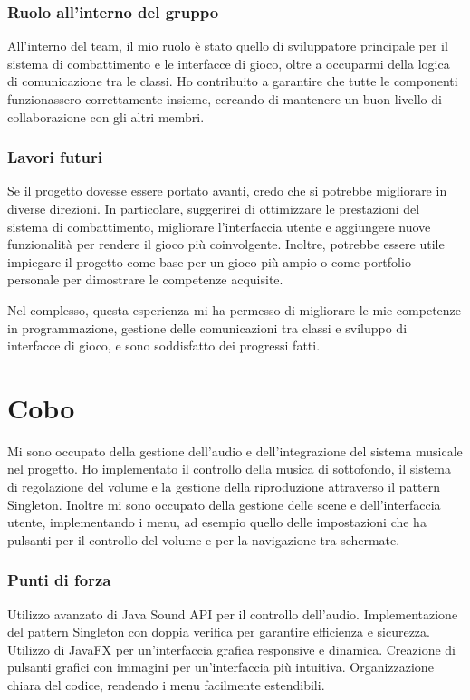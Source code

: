 \documentclass[a4paper,12pt]{report}
\begin{document}
\subsubsection{Ruolo all'interno del gruppo}
All'interno del team, il mio ruolo è stato quello di sviluppatore principale per il sistema di combattimento e le interfacce di gioco, oltre a occuparmi della logica di comunicazione tra le classi. Ho contribuito a garantire che tutte le componenti funzionassero correttamente insieme, cercando di mantenere un buon livello di collaborazione con gli altri membri.

\subsubsection{Lavori futuri}
Se il progetto dovesse essere portato avanti, credo che si potrebbe migliorare in diverse direzioni. In particolare, suggerirei di ottimizzare le prestazioni del sistema di combattimento, migliorare l'interfaccia utente e aggiungere nuove funzionalità per rendere il gioco più coinvolgente. Inoltre, potrebbe essere utile impiegare il progetto come base per un gioco più ampio o come portfolio personale per dimostrare le competenze acquisite.

Nel complesso, questa esperienza mi ha permesso di migliorare le mie competenze in programmazione, gestione delle comunicazioni tra classi e sviluppo di interfacce di gioco, e sono soddisfatto dei progressi fatti.

\section{Cobo}
Mi sono occupato della gestione dell’audio e dell’integrazione del sistema musicale nel progetto. Ho implementato il controllo della musica di sottofondo, il sistema di regolazione del volume e la gestione della riproduzione attraverso il pattern Singleton. Inoltre mi sono occupato della gestione delle scene e dell’interfaccia utente, implementando i menu, ad esempio quello delle impostazioni che ha pulsanti per il controllo del volume e per la navigazione tra schermate.

\subsubsection{Punti di forza}
Utilizzo avanzato di Java Sound API per il controllo dell’audio.
Implementazione del pattern Singleton con doppia verifica per garantire efficienza e sicurezza.
Utilizzo di JavaFX per un'interfaccia grafica responsive e dinamica.
Creazione di pulsanti grafici con immagini per un’interfaccia più intuitiva.
Organizzazione chiara del codice, rendendo i menu facilmente estendibili.
\end{document}
